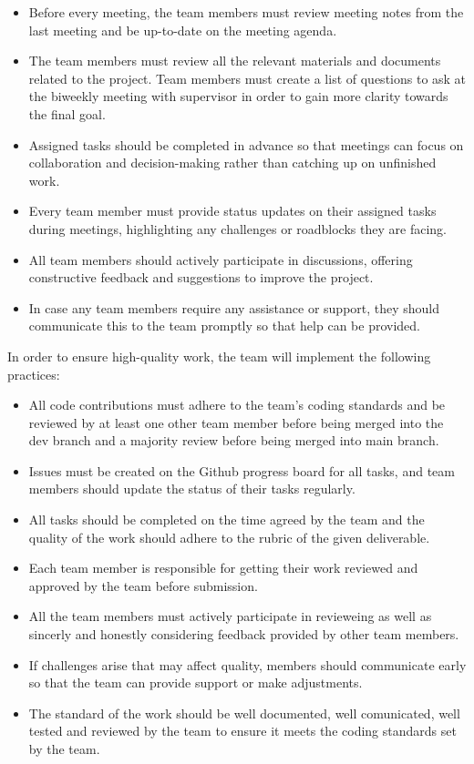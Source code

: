 \documentclass{article}
\begin{document}
\begin{itemize}
  \item Before every meeting, the team members must review meeting notes from the last meeting and be up-to-date on the meeting agenda.
  \item The team members must review all the relevant materials and documents related to the project. Team members must create a list of questions to ask at the biweekly meeting with supervisor in order to gain more clarity towards the final goal.
  \item Assigned tasks should be completed in advance so that meetings can focus on collaboration and decision-making rather than catching up on unfinished work.
  \item Every team member must provide status updates on their assigned tasks during meetings, highlighting any challenges or roadblocks they are facing.
  \item All team members should actively participate in discussions, offering constructive feedback and suggestions to improve the project.
  \item In case any team members require any assistance or support, they should communicate this to the team promptly so that help can be provided.
\end{itemize}

\noindent In order to ensure high-quality work, the team will implement the following practices:

\begin{itemize}
  \item All code contributions must adhere to the team's coding standards and be reviewed by at least one other team member before being merged 
  into the dev branch and a majority review before being merged into main branch.
  \item Issues must be created on the Github progress board for all tasks, and team members should update the status of their tasks regularly.
  \item All tasks should be completed on the time agreed by the team and the quality of the work should adhere to the rubric of the given deliverable.
  \item Each team member is responsible for getting their work reviewed and approved by the team before submission.
  \item All the team members must actively participate in revieweing as well as sincerly and honestly considering feedback provided by other team members.
  \item If challenges arise that may affect quality, members should communicate early so that the team can provide support or make adjustments.
  \item The standard of the work should be well documented, well comunicated, well tested and reviewed by the team to ensure it meets the coding standards set by the team.
\end{itemize}
\end{document}
